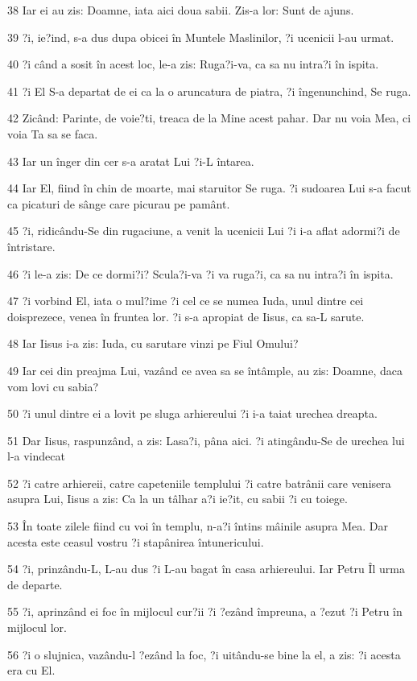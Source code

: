 \par 38 Iar ei au zis: Doamne, iata aici doua sabii. Zis-a lor: Sunt de ajuns.
\par 39 ?i, ie?ind, s-a dus dupa obicei în Muntele Maslinilor, ?i ucenicii l-au urmat.
\par 40 ?i când a sosit în acest loc, le-a zis: Ruga?i-va, ca sa nu intra?i în ispita.
\par 41 ?i El S-a departat de ei ca la o aruncatura de piatra, ?i îngenunchind, Se ruga.
\par 42 Zicând: Parinte, de voie?ti, treaca de la Mine acest pahar. Dar nu voia Mea, ci voia Ta sa se faca.
\par 43 Iar un înger din cer s-a aratat Lui ?i-L întarea.
\par 44 Iar El, fiind în chin de moarte, mai staruitor Se ruga. ?i sudoarea Lui s-a facut ca picaturi de sânge care picurau pe pamânt.
\par 45 ?i, ridicându-Se din rugaciune, a venit la ucenicii Lui ?i i-a aflat adormi?i de întristare.
\par 46 ?i le-a zis: De ce dormi?i? Scula?i-va ?i va ruga?i, ca sa nu intra?i în ispita.
\par 47 ?i vorbind El, iata o mul?ime ?i cel ce se numea Iuda, unul dintre cei doisprezece, venea în fruntea lor. ?i s-a apropiat de Iisus, ca sa-L sarute.
\par 48 Iar Iisus i-a zis: Iuda, cu sarutare vinzi pe Fiul Omului?
\par 49 Iar cei din preajma Lui, vazând ce avea sa se întâmple, au zis: Doamne, daca vom lovi cu sabia?
\par 50 ?i unul dintre ei a lovit pe sluga arhiereului ?i i-a taiat urechea dreapta.
\par 51 Dar Iisus, raspunzând, a zis: Lasa?i, pâna aici. ?i atingându-Se de urechea lui l-a vindecat
\par 52 ?i catre arhiereii, catre capeteniile templului ?i catre batrânii care venisera asupra Lui, Iisus a zis: Ca la un tâlhar a?i ie?it, cu sabii ?i cu toiege.
\par 53 În toate zilele fiind cu voi în templu, n-a?i întins mâinile asupra Mea. Dar acesta este ceasul vostru ?i stapânirea întunericului.
\par 54 ?i, prinzându-L, L-au dus ?i L-au bagat în casa arhiereului. Iar Petru Îl urma de departe.
\par 55 ?i, aprinzând ei foc în mijlocul cur?ii ?i ?ezând împreuna, a ?ezut ?i Petru în mijlocul lor.
\par 56 ?i o slujnica, vazându-l ?ezând la foc, ?i uitându-se bine la el, a zis: ?i acesta era cu El.
